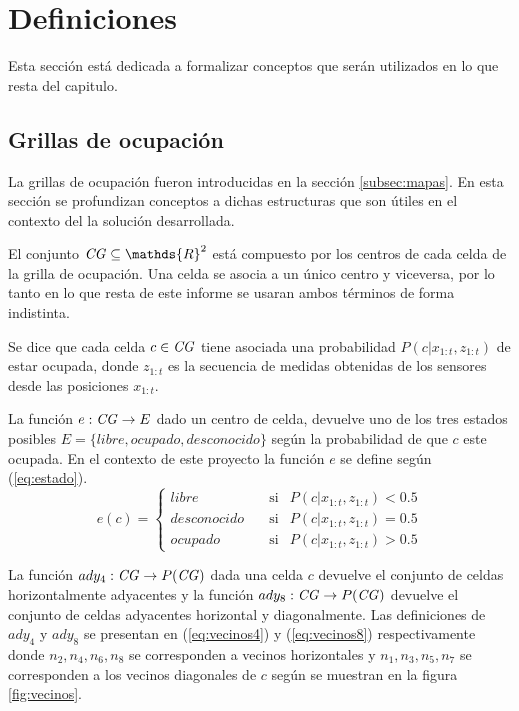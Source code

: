 \section{Definiciones} \label{sec:def}
Esta sección está dedicada a formalizar conceptos que serán utilizados en lo
que resta del capitulo.

\subsection{Grillas de ocupación}\label{subsec:Grilla}
La grillas de ocupación fueron introducidas en la sección \ref{subsec:mapas}.
En esta sección se profundizan conceptos a dichas estructuras que son útiles en
el contexto del la solución desarrollada.

El conjunto $\mli{CG}\subseteq \mathds{R}^2$ está compuesto por los centros de cada
celda de la grilla de ocupación. Una celda se asocia a un único centro y
viceversa, por lo tanto en lo que resta de este informe se usaran ambos
términos de forma indistinta.

Se dice que cada celda $c\in \mathit{CG}$ tiene asociada una probabilidad $P(c|x_{1:t},z_{1:t})$
de estar ocupada, donde $z_{1:t}$ es la secuencia de medidas obtenidas de los
sensores desde las posiciones $x_{1:t}$.

La función $e : \mathit{CG} \rightarrow E$ dado un centro de celda, devuelve uno
de los tres estados posibles $E=\{libre, ocupado, desconocido\}$ según la
probabilidad de que $c$ este ocupada. En el contexto de este proyecto la
función $e$ se define según
(\ref{eq:estado}).
\begin{equation} 
  e(c)= 
  \left \{ 
    \begin{aligned}
       libre       &\ \ \ \text{ si}& P(c|x_{1:t},z_{1:t}) < 0.5 \\
       desconocido &\ \ \ \text{ si}& P(c|x_{1:t},z_{1:t}) = 0.5 \\
       ocupado     &\ \ \ \text{ si}& P(c|x_{1:t},z_{1:t}) > 0.5
    \end{aligned}
  \right .
  \label{eq:estado}
\end{equation}

La función $ady_4 : \mathit{CG} \rightarrow P(\mathit{CG})$ dada una celda $c$ devuelve el conjunto
de celdas horizontalmente adyacentes y la función $ady_8 : \mathit{CG} \rightarrow P(\mathit{CG})$
devuelve el conjunto de celdas adyacentes horizontal y diagonalmente. Las
definiciones de $ady_4$ y $ady_8$ se presentan en (\ref{eq:vecinos4}) y
(\ref{eq:vecinos8}) respectivamente donde $n_2, n_4, n_6, n_8$ se corresponden
a vecinos horizontales y $n_1, n_3, n_5, n_7$ se corresponden a los vecinos
diagonales de $c$ según se muestran en la figura \ref{fig:vecinos}.


